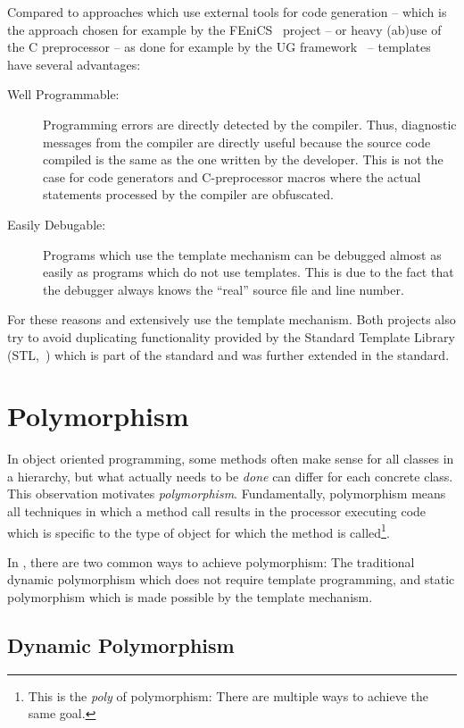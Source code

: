 Compared to approaches which use external tools for code generation --
which is the approach chosen for example by the
FEniCS~\cite{FENICS-HP} project -- or heavy (ab)use of the C
preprocessor -- as done for example by the UG framework~\cite{UG-HP}
-- templates have several advantages:
\begin{description}
\item[Well Programmable:] Programming errors are directly detected by
  the \Cplusplus compiler. Thus, diagnostic messages from the compiler are
  directly useful because the source code compiled is the
  same as the one written by the developer. This is not the case
  for code generators and C-preprocessor macros where the actual
  statements processed by the compiler are obfuscated.
\item[Easily Debugable:] Programs which use the template mechanism can be
  debugged almost as easily as \Cplusplus programs which do not use
  templates. This is due to the fact that the debugger always knows
  the ``real'' source file and line number.
\end{description}
For these reasons \Dune and \eWoms extensively use the template
mechanism. Both projects also try to avoid duplicating functionality
provided by the Standard Template Library (STL,~\cite{STL-REF-HP})
which is part of the  standard and was further extended
in the  standard.

\section{Polymorphism}

In object oriented programming, some methods often make sense for all
classes in a hierarchy, but what actually needs to be \textit{done}
can differ for each concrete class. This observation motivates
\textit{polymorphism}. Fundamentally, polymorphism means all
techniques in which a method call results in the processor executing code
which is specific to the type of object for which the method is
called\footnote{This is the \textit{poly} of polymorphism: There are
  multiple ways to achieve the same goal.}.

In \Cplusplus, there are two common ways to achieve polymorphism: The
traditional dynamic polymorphism which does not require template
programming, and static polymorphism which is made possible by the
template mechanism.

\subsection*{Dynamic Polymorphism}

